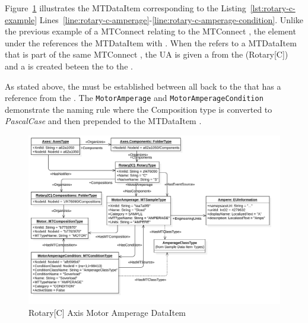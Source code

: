 \FloatBarrier

Figure~\ref{fig:rotary-c-amperage} illustrates the  \gls{MTDataItem} corresponding to the Listing~\ref{lst:rotary-c-example} Lines~\ref{line:rotary-c-amperage}-\ref{line:rotary-c-amperage-condition}. Unlike the previous example of a MTConnect  relating to the MTConnect , the  element under the  references the \gls{MTDataItem} with  . When the  refers to a \gls{MTDataItem} that is part of the same MTConnect , the UA  is given a   from the  (Rotary[C]) and a   is created beteen the  to the .

As stated above, the   must be established between all  back to the  that has a reference from the . The \texttt{MotorAmperage} and \texttt{MotorAmperageCondition} demonstrate the naming rule where the Composition type is converted to \textit{PascalCase} and then prepended to the \gls{MTDataItem} . 

\begin{figure}[ht]
  \centering
  \includegraphics[width=1.0\textwidth]{diagrams/mtconnect-mapping/rotary-c-amperage.png}
  \caption{Rotary[C] Axis Motor Amperage DataItem}
  \label{fig:rotary-c-amperage}
\end{figure}

\FloatBarrier

